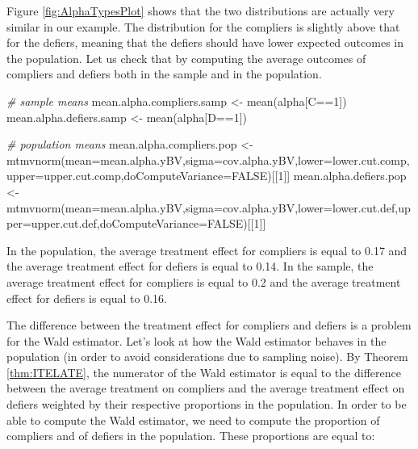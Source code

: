 \documentclass[
]{book}
\newenvironment{Shaded}{\begin{snugshade}}{\end{snugshade}}
\newcommand{\AttributeTok}[1]{\textcolor[rgb]{0.77,0.63,0.00}{#1}}
\newcommand{\CommentTok}[1]{\textcolor[rgb]{0.56,0.35,0.01}{\textit{#1}}}
\newcommand{\ConstantTok}[1]{\textcolor[rgb]{0.00,0.00,0.00}{#1}}
\newcommand{\DecValTok}[1]{\textcolor[rgb]{0.00,0.00,0.81}{#1}}
\newcommand{\FunctionTok}[1]{\textcolor[rgb]{0.00,0.00,0.00}{#1}}
\newcommand{\NormalTok}[1]{#1}
\newcommand{\OtherTok}[1]{\textcolor[rgb]{0.56,0.35,0.01}{#1}}
\newcommand{\SpecialCharTok}[1]{\textcolor[rgb]{0.00,0.00,0.00}{#1}}
\theoremstyle{definition}
\theoremstyle{definition}
\theoremstyle{definition}
\theoremstyle{definition}
\theoremstyle{remark}
\begin{document}
Figure \ref{fig:AlphaTypesPlot} shows that the two distributions are actually very similar in our example.
The distribution for the compliers is slightly above that for the defiers, meaning that the defiers should have lower expected outcomes in the population.
Let us check that by computing the average outcomes of compliers and defiers both in the sample and in the population.

\begin{Shaded}
\begin{Highlighting}[]
\CommentTok{\# sample means}
\NormalTok{mean.alpha.compliers.samp }\OtherTok{\textless{}{-}} \FunctionTok{mean}\NormalTok{(alpha[C}\SpecialCharTok{==}\DecValTok{1}\NormalTok{]) }
\NormalTok{mean.alpha.defiers.samp }\OtherTok{\textless{}{-}} \FunctionTok{mean}\NormalTok{(alpha[D}\SpecialCharTok{==}\DecValTok{1}\NormalTok{]) }

\CommentTok{\# population means}
\NormalTok{mean.alpha.compliers.pop }\OtherTok{\textless{}{-}} \FunctionTok{mtmvnorm}\NormalTok{(}\AttributeTok{mean=}\NormalTok{mean.alpha.yBV,}\AttributeTok{sigma=}\NormalTok{cov.alpha.yBV,}\AttributeTok{lower=}\NormalTok{lower.cut.comp,}\AttributeTok{upper=}\NormalTok{upper.cut.comp,}\AttributeTok{doComputeVariance=}\ConstantTok{FALSE}\NormalTok{)[[}\DecValTok{1}\NormalTok{]]}
\NormalTok{mean.alpha.defiers.pop }\OtherTok{\textless{}{-}}  \FunctionTok{mtmvnorm}\NormalTok{(}\AttributeTok{mean=}\NormalTok{mean.alpha.yBV,}\AttributeTok{sigma=}\NormalTok{cov.alpha.yBV,}\AttributeTok{lower=}\NormalTok{lower.cut.def,}\AttributeTok{upper=}\NormalTok{upper.cut.def,}\AttributeTok{doComputeVariance=}\ConstantTok{FALSE}\NormalTok{)[[}\DecValTok{1}\NormalTok{]]}
\end{Highlighting}
\end{Shaded}

In the population, the average treatment effect for compliers is equal to 0.17 and the average treatment effect for defiers is equal to 0.14.
In the sample, the average treatment effect for compliers is equal to 0.2 and the average treatment effect for defiers is equal to 0.16.

The difference between the treatment effect for compliers and defiers is a problem for the Wald estimator.
Let's look at how the Wald estimator behaves in the population (in order to avoid considerations due to sampling noise).
By Theorem \ref{thm:ITELATE}, the numerator of the Wald estimator is equal to the difference between the average treatment on compliers and the average treatment effect on defiers weighted by their respective proportions in the population.
In order to be able to compute the Wald estimator, we need to compute the proportion of compliers and of defiers in the population.
These proportions are equal to:
\end{document}
